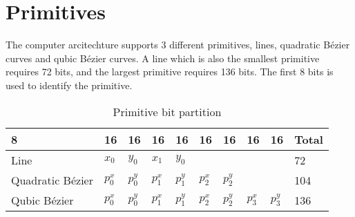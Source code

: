 \section{Primitives}
The computer arcitechture supports 3 different primitives, lines, quadratic Bézier curves and qubic Bézier curves.
A line which is also the smallest primitive requires 72 bits, and the largest primitive requires 136 bits.
The first 8 bits is used to identify the primitive.

\begin{table}
    \label{tbl:primitives}
    \centering
    \begin{tabular}{|l|l|l|l|l|l|l|l|l|l|}
    \hline
    8                & 16  & 16  & 16  & 16  & 16  & 16  & 16  & 16  & Total \\ \hline
    Line             & \(x_0 \)  & \(y_0 \)  & \(x_1 \)  & \(y_0 \)  & ~   & ~   & ~   & ~   & 72    \\ \hline
    Quadratic Bézier & \(p_0^x \) & \(p_0^y \) & \(p_1^x \) & \(p_1^y \) & \(p_2^x \) & \(p_2^y \) & ~   & ~   & 104   \\ \hline
    Qubic Bézier     & \(p_0^x \) & \(p_0^y \) & \(p_1^x \) & \(p_1^y \) & \(p_2^x \) & \(p_2^y \) & \(p_3^x \) & \(p_3^y \) & 136   \\ \hline
    \end{tabular}
    \caption{Primitive bit partition}
\end{table}
